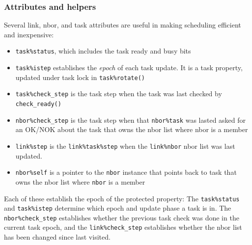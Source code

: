 \documentclass[paper=a4,fontsize=11pt]{scrartcl}
\numberwithin{equation}{section}		%
\numberwithin{figure}{section}			%
\numberwithin{table}{section}				%
\newcommand{\codecolor}{\color{Blue}}
\newcommand{\Code}[1]{{\codecolor\texttt{#1}}}
\def\checkready{\Code{check\_ready()}}
\begin{document}
\subsubsection{Attributes and helpers}
Several link, nbor, and task attributes are useful in making scheduling efficient and inexpensive:
\begin{itemize}
    \item \verb|task%status|, which includes the task ready and busy bits
    \item \verb|task%istep| establishes the \textit{epoch} of each task update.  It is a task property, updated under task lock in \verb|task%rotate()|
    \item \verb|task%check_step| is the task step when the task was last checked by \checkready{}
    \item \verb|nbor%check_step| is the task step when that \verb|nbor%task| was lasted asked for an OK/NOK about the task that owns the nbor list where nbor is a member
    \item \verb|link%step| is the \verb|link%task%step| when the \verb|link%nbor| nbor list was last updated.
    \item \verb|nbor%self| is a pointer to the \verb|nbor| instance that points back to task that owns the nbor list where \verb|nbor| is a member
\end{itemize}
Each of these establish the epoch of the protected property: The \verb|task%status| and \verb|task%istep| determine which epoch and update phase a task is in.  The \verb|nbor%check_step| establishes whether the previous task check was done in the current task epoch, and the \verb|link%check_step| establishes whether the nbor list has been changed since last visited.   
\end{document}
